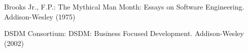 \documentclass[lnbip]{svmultln}
\begin{document}
%
%
\begin{thebibliography}{5}

 Brooks Jr., F.P.: The Mythical Man Month: Essays
  on Software Engineering. Addison-Wesley (1975)

 DSDM Consortium: DSDM: Business Focused
  Development. Addison-Wesley (2002)




\end{thebibliography}
%
\end{document}
